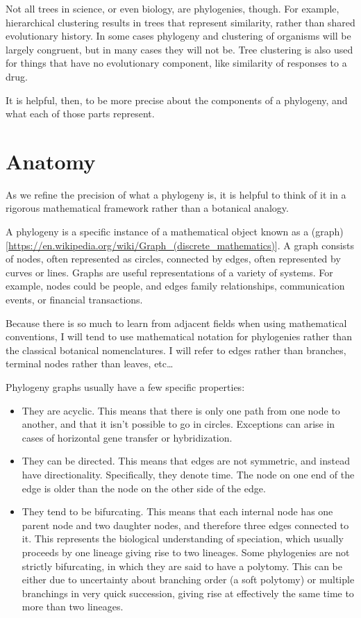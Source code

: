 \documentclass[
]{book}
\begin{document}
Not all trees in science, or even biology, are phylogenies, though. For example,
hierarchical clustering results in trees that represent similarity, rather than
shared evolutionary history. In some cases phylogeny and clustering of organisms
will be largely congruent, but in many cases they will not be. Tree clustering is also
used for things that have no evolutionary component, like similarity of responses
to a drug.

It is helpful, then, to be more precise about the components of a phylogeny, and
what each of those parts represent.

\hypertarget{anatomy}{%
\section{Anatomy}\label{anatomy}}

As we refine the precision of what a phylogeny is, it is helpful to think of it
in a rigorous mathematical framework rather than a botanical analogy.

A phylogeny is a specific instance of a mathematical object known as a (graph){[}\url{https://en.wikipedia.org/wiki/Graph_(discrete_mathematics)}{]}.
A graph consists of nodes, often represented as circles, connected by edges, often
represented by curves or lines. Graphs are useful representations of a variety of systems.
For example, nodes could be people, and edges family relationships, communication events, or financial transactions.

Because there is so much to learn from adjacent fields when using mathematical conventions,
I will tend to use mathematical notation for phylogenies rather than the classical botanical
nomenclatures. I will refer to edges rather than branches, terminal nodes rather than leaves,
etc\ldots{}

Phylogeny graphs usually have a few specific properties:

\begin{itemize}
\item
  They are acyclic. This means that there is only one path from one node to another,
  and that it isn't possible to go in circles. Exceptions can arise in cases of horizontal
  gene transfer or hybridization.
\item
  They can be directed. This means that edges are not symmetric, and instead have
  directionality. Specifically, they denote time. The node on one end of the edge
  is older than the node on the other side of the edge.
\item
  They tend to be bifurcating. This means that each internal node has one parent node and two daughter nodes, and therefore three edges connected to it. This represents the biological understanding of speciation, which usually proceeds by one lineage giving rise to two lineages. Some phylogenies are not strictly bifurcating, in which they are said to have a polytomy. This can be either due to uncertainty about branching order (a soft polytomy) or multiple branchings in very quick succession, giving rise at effectively the same time to more than two lineages.
\end{itemize}
\end{document}
